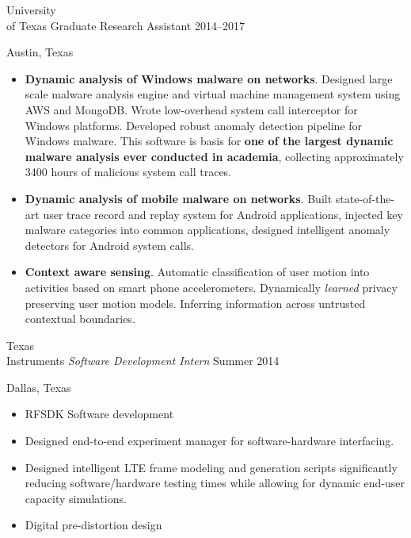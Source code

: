 \documentclass[]{friggeri-cv} %
\begin{document}
\begin{entrylist}

\entry
{University \\ of Texas}
{Graduate Research Assistant}
{2014--2017}
{Austin, Texas \\
\begin{itemize}
\item \textbf{Dynamic analysis of Windows malware on networks}. Designed large scale malware analysis engine and virtual machine management system using AWS and MongoDB. Wrote low-overhead system call interceptor for Windows platforms. Developed robust anomaly detection pipeline for Windows malware. This software is basis for \textbf{one of the largest dynamic malware analysis ever conducted in academia}, collecting approximately 3400 hours of malicious system call traces.
\item \textbf{Dynamic analysis of mobile malware on networks}. Built state-of-the-art user trace record and replay system for Android applications, injected key malware categories into common applications, designed intelligent anomaly detectors for Android system calls.
\item \textbf{Context aware sensing}. Automatic classification of user motion into activities based on smart phone accelerometers. Dynamically \textit{learned} privacy preserving user motion models. Inferring information across untrusted contextual boundaries. 
\end{itemize} }

\entry
{Texas \\ Instruments}
{\emph{Software Development Intern}}
{Summer 2014}
{Dallas, Texas \\  
\begin{itemize}
\item RFSDK Software development
\item Designed end-to-end experiment manager for software-hardware interfacing.
\item Designed intelligent LTE frame modeling and generation scripts significantly reducing software/hardware testing times while allowing for dynamic end-user capacity simulations.
\item Digital pre-distortion design 
\end{itemize}}


\end{entrylist}
\end{document}
